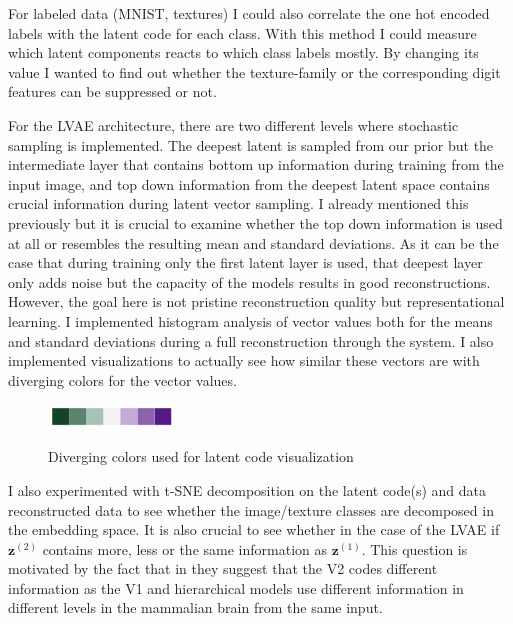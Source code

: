 \documentclass[12pt, english]{article}
\begin{document}
\vspace{4mm}

\par For labeled data (MNIST, textures) I could also correlate the one hot encoded labels with the latent code for each class. With this method I could measure which latent components reacts to which class labels mostly. By changing its value I wanted to find out whether the texture-family or the corresponding digit features can be suppressed or not.

\vspace{4mm}

\par For the LVAE architecture, there are two different levels where stochastic sampling is implemented. The deepest latent is sampled from our prior but the intermediate layer that contains bottom up information during training from the input image, and top down information from the deepest latent space contains crucial information during latent vector sampling. I already mentioned this previously but it is crucial to examine whether the top down information is used at all or resembles the resulting mean and standard deviations. As it can be the case that during training only the first latent layer is used, that deepest layer only adds noise but the capacity of the models results in good reconstructions. However, the goal here is not pristine reconstruction quality but representational learning. I implemented histogram analysis of vector values both for the means and standard deviations during a full reconstruction through the system. I also implemented visualizations to actually see how similar these vectors are with diverging colors for the vector values.

\vspace{4mm}

\begin{figure}[H]
    \centering
    \includegraphics[width=0.3\textwidth]{diverging_color.png}
    \label{fig:diverging_colors}
    \caption{Diverging colors used for latent code visualization}
\end{figure}

\vspace{4mm}

\par I also experimented with t-SNE \cite{maaten2008visualizing} decomposition on the latent code(s) and data reconstructed data to see whether the image/texture classes are decomposed in the embedding space. It is also crucial to see whether in the case of the LVAE if $\bm{z}^{(2)}$ contains more, less or the same information as $\bm{z}^{(1)}$. This question is motivated by the fact that in \cite{ZiembaV2} they suggest that the V2 codes different information as the V1 and hierarchical models use different information in different levels in the mammalian brain from the same input.
\end{document}
